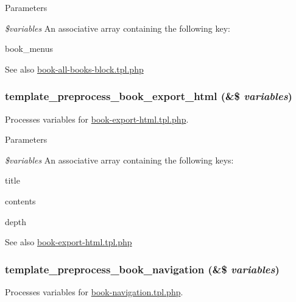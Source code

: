 \begin{DoxyParams}{Parameters}
\item[{\em \$variables}]An associative array containing the following key:
\begin{DoxyItemize}
\item book\_\-menus
\end{DoxyItemize}\end{DoxyParams}
\begin{DoxySeeAlso}{See also}
\hyperlink{book-all-books-block_8tpl_8php}{book-\/all-\/books-\/block.tpl.php} 
\end{DoxySeeAlso}
\hypertarget{book_8module_ac66a30414a0cb26861b69beeab40a63d}{
\subsubsection[{template\_\-preprocess\_\-book\_\-export\_\-html}]{\setlength{\rightskip}{0pt plus 5cm}template\_\-preprocess\_\-book\_\-export\_\-html (\&\$ {\em variables})}}
\label{book_8module_ac66a30414a0cb26861b69beeab40a63d}
Processes variables for \hyperlink{book-export-html_8tpl_8php}{book-\/export-\/html.tpl.php}.


\begin{DoxyParams}{Parameters}
\item[{\em \$variables}]An associative array containing the following keys:
\begin{DoxyItemize}
\item title
\item contents
\item depth
\end{DoxyItemize}\end{DoxyParams}
\begin{DoxySeeAlso}{See also}
\hyperlink{book-export-html_8tpl_8php}{book-\/export-\/html.tpl.php} 
\end{DoxySeeAlso}
\hypertarget{book_8module_aa5d42034a0e369d49bb21ae74409e9fa}{
\subsubsection[{template\_\-preprocess\_\-book\_\-navigation}]{\setlength{\rightskip}{0pt plus 5cm}template\_\-preprocess\_\-book\_\-navigation (\&\$ {\em variables})}}
\label{book_8module_aa5d42034a0e369d49bb21ae74409e9fa}
Processes variables for \hyperlink{book-navigation_8tpl_8php}{book-\/navigation.tpl.php}.



